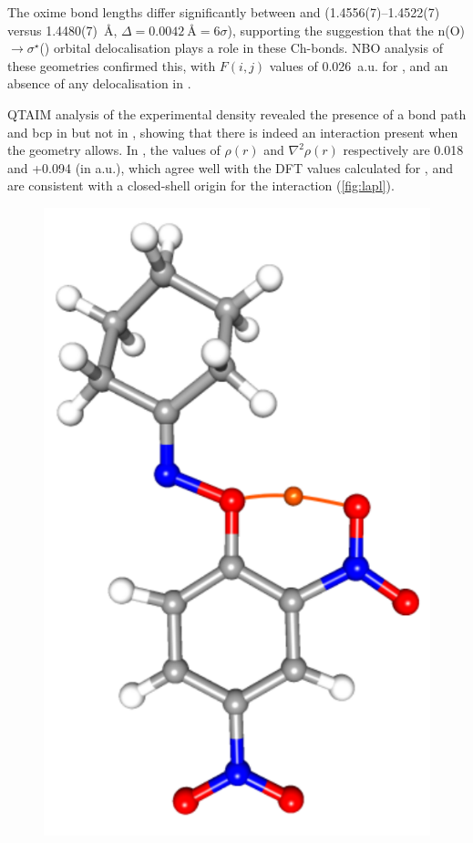 \begin{refsection}
The oxime bond lengths differ significantly between  and  (1.4556(7)--1.4522(7) versus 1.4480(7)~\AA, $\Delta = 0.0042~\text{\AA} = 6\sigma$), supporting the suggestion that the n(O)$\rightarrow \sigma^{\star}$() orbital delocalisation plays a role in these Ch-bonds.
NBO analysis of these geometries confirmed this, with $F(i,j)$ values of 0.026~a.u. for , and an absence of any delocalisation in .

QTAIM analysis of the experimental density revealed the presence of a bond path and bcp in  but not in , showing that there is indeed an interaction present when the geometry allows.
In , the values of $\rho(r)$ and $\nabla^{2}\rho(r)$ respectively are 0.018 and +0.094 (in a.u.), which agree well with the DFT values calculated for , and are consistent with a closed-shell origin for the interaction (\cref{fig:lapl}).

\begin{figure}
	\centering
	\includegraphics[width=0.3\columnwidth]{Figures/cyclohexanone-oxime-dnp-bcp.pdf}


\end{figure}
\end{refsection}
